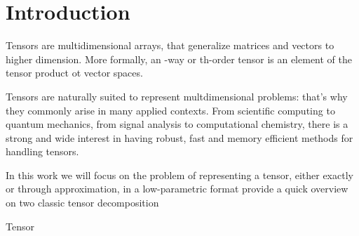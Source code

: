 \chapter{Introduction}
Tensors are multidimensional arrays, that generalize matrices and vectors to higher dimension. More formally, an \N-way or \N th-order tensor is an element of the tensor product ot \N vector spaces.

Tensors are naturally suited to represent multdimensional problems: that's why they commonly arise in many applied contexts. From scientific computing to quantum mechanics, from signal analysis to computational chemistry, there is a strong and wide interest in having robust, fast and memory efficient methods for handling tensors.

In this work we will focus on the problem of representing a tensor, either exactly or through approximation, in a low-parametric format
provide a quick overview on two classic tensor decomposition

Tensor \X


